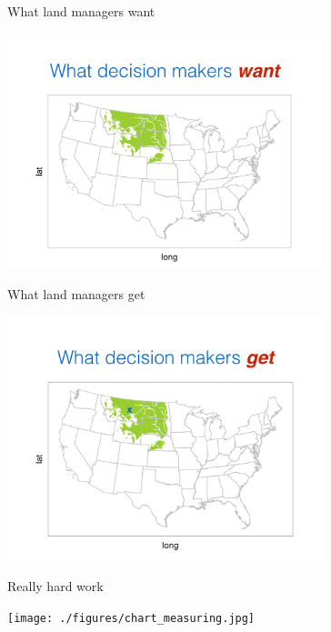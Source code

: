 \documentclass[12pt, compress, aspectratio=1610]{beamer}
\let\OldTexttt\texttt
\renewcommand{\texttt}[1]{\OldTexttt{\color{codecolor}#1}}
\begin{document}
\begin{frame}{%
\protect\hypertarget{what-land-managers-want}{%
What land managers want}}

\centering

\includegraphics[height=2.7in]{./figures/managers_want.pdf}

\end{frame}

\begin{frame}{%
\protect\hypertarget{what-land-managers-get}{%
What land managers get}}

\centering

\includegraphics[height=2.8in]{./figures/managers_get.pdf}

\end{frame}

\begin{frame}{%
\protect\hypertarget{really-hard-work}{%
Really hard work}}

\texttt{[image: ./figures/chart\_measuring.jpg]}

\end{frame}
\end{document}
